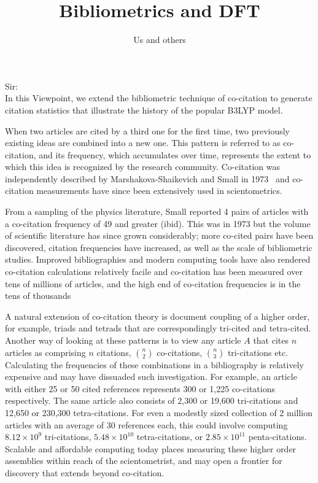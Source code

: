 \documentclass[notitlepage]{report}
\title{Bibliometrics and DFT}
\author{Us and others}
\date{}
\begin{document}
\maketitle
\thispagestyle{empty}
Sir:\\

In this Viewpoint, we extend the bibliometric technique of co-citation to generate citation statistics that illustrate the history of the popular B3LYP model.


When two articles are cited by a third one for the first time, two previously existing ideas are combined into a new one. This pattern is referred to as co-citation, and its frequency, which accumulates over time, represents the extent to which this idea is recognized by the research community. Co-citation was independently described by Marshakova-Shaikevich and Small in 1973~\citep{MarshakovaShaikevich1973,Small1973} and co-citation measurements have since been extensively used in scientometrics. 

From a sampling of the physics literature, Small reported 4 pairs of articles with a co-citation frequency of 49 and greater (ibid). This was in 1973 but the volume of scientific literature has since grown considerably; more co-cited pairs have been discovered, citation frequencies have increased, as well as the scale of bibliometric studies. Improved bibliographies and modern computing tools have also rendered co-citation calculations relatively facile and co-citation has been measured over tens of millions of articles, and the high end of co-citation frequencies is in the tens of thousands~\citep{Stringer2010,Uzzi2013,devarakonda_2020}

A natural extension of co-citation theory is document coupling of a higher order, for example, triads and tetrads that are correspondingly tri-cited and tetra-cited. Another way of looking at these patterns is to view any article $A$ that cites $n$ articles as comprising $n$ citations, $n\choose2$ co-citations, $n\choose3$ tri-citations etc. Calculating the frequencies of these combinations in a bibliography is relatively expensive and may have dissuaded such investigation. For example, an article with either 25 or 50 cited references represents 300 or 1,225 co-citations respectively. The same article also consists of  2,300 or 19,600 tri-citations and  12,650 or  230,300 tetra-citations. For even a modestly sized collection of 2 million articles with an average of 30 references each, this could involve computing $8.12\times10^9$ tri-citations, $5.48\times10^{10}$ tetra-citations, or $2.85\times10^{11}$ penta-citations. Scalable and affordable computing today places measuring these higher order assemblies within reach of the scientometrist, and may open a frontier for discovery that extends beyond co-citation.
\end{document}

